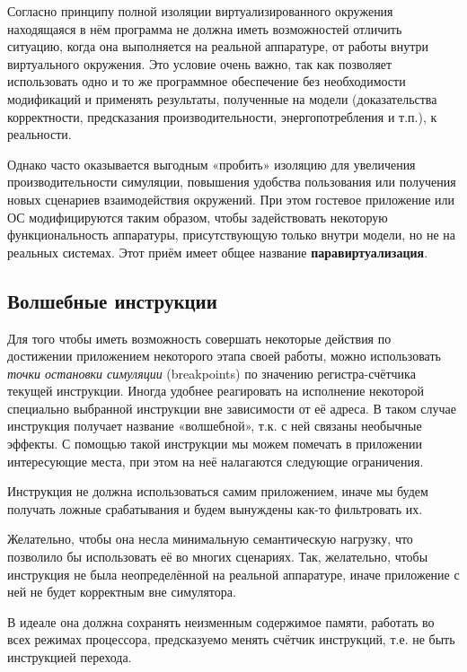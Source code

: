 Согласно принципу полной изоляции виртуализированного окружения находящаяся в нём программа не должна иметь возможностей отличить ситуацию, когда она выполняется на реальной аппаратуре, от работы внутри виртуального окружения. Это условие очень важно, так как позволяет использовать одно и то же программное обеспечение без необходимости модификаций и применять результаты, полученные на модели (доказательства корректности, предсказания производительности, энергопотребления и т.п.), к реальности.

Однако часто оказывается выгодным «пробить» изоляцию для увеличения производительности симуляции, повышения удобства пользования или получения новых сценариев взаимодействия окружений. При этом гостевое приложение или ОС модифицируются таким образом, чтобы задействовать некоторую функциональность аппаратуры, присутствующую только внутри модели, но не на реальных системах. Этот приём имеет общее название \textbf{паравиртуализация}.

\subsection{Волшебные инструкции}

Для того чтобы иметь возможность совершать некоторые действия по достижении приложением некоторого этапа своей работы, можно использовать \textit{точки остановки симуляции} (\abbr breakpoints) по значению регистра-счётчика текущей инструкции. Иногда удобнее реагировать на исполнение некоторой специально выбранной инструкции вне зависимости от её адреса. В таком случае инструкция получает название «волшебной», т.к. с ней связаны необычные эффекты. С помощью такой инструкции мы можем помечать в приложении интересующие места, при этом на неё налагаются следующие ограничения.

\begin{itemize*}
\item    Инструкция не должна использоваться самим приложением, иначе мы будем получать ложные срабатывания и будем вынуждены как-то фильтровать их.
\item    Желательно, чтобы она несла минимальную семантическую нагрузку, что позволило бы использовать её во многих сценариях. Так, желательно, чтобы инструкция не была неопределённой на реальной аппаратуре, иначе приложение с ней не будет корректным вне симулятора. 
\item В идеале она должна сохранять неизменным содержимое памяти, работать во всех режимах процессора, предсказуемо менять счётчик инструкций, т.е. не быть инструкцией перехода. 
\end{itemize*}

